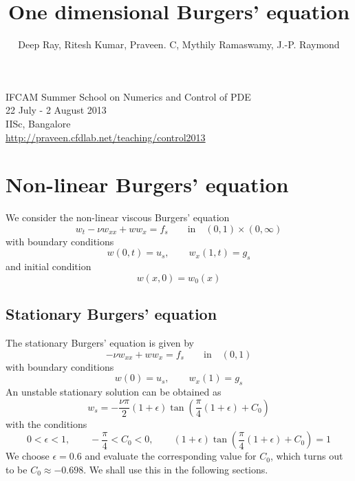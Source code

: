 \documentclass[12pt]{article}
\title{One dimensional Burgers' equation}
\author{Deep Ray, Ritesh Kumar, Praveen. C, Mythily Ramaswamy, J.-P. Raymond}
\date{}
\begin{document}
\maketitle
\begin{center}
IFCAM Summer School on Numerics and Control of PDE\\
22 July - 2 August 2013\\
IISc, Bangalore\\
\url{http://praveen.cfdlab.net/teaching/control2013}
\end{center}

\section{Non-linear Burgers' equation}
We consider the non-linear viscous Burgers' equation
\begin{equation}
w_t -\nu w_{xx} + w w_x = f_s \qquad \mbox{in} \quad (0,1)\times (0,\infty)
\end{equation}
with boundary conditions
\begin{equation}
w(0,t) = u_s, \qquad w_x(1,t) = g_s
\end{equation}
and initial condition
\begin{equation}
w(x,0) = w_0(x)
\end{equation}

\subsection{Stationary Burgers' equation}
The stationary Burgers' equation is given by
\begin{equation}
-\nu w_{xx} + w w_x = f_s \qquad \mbox{in} \quad (0,1) 
\end{equation}
with boundary conditions
\begin{equation}
w(0) = u_s, \qquad w_x(1) = g_s
\end{equation}
An unstable stationary solution can be obtained as
\begin{equation}
 w_s = - \frac{\nu \pi}{2} (1 + \epsilon) \tan{\left( \frac{\pi}{4}(1+ \epsilon) + C_0 \right)}
\end{equation}
with the conditions
\[
 0 < \epsilon < 1, \qquad -\frac{\pi}{4} < C_0 < 0, \qquad (1 + \epsilon) \tan{\left( \frac{\pi}{4}(1+ \epsilon) + C_0 \right)} = 1
\]
We choose $\epsilon = 0.6$ and evaluate the corresponding value for $C_0$, which turns out to be $C_0 \approx -0.698$. We shall use this in the following sections.
\end{document}
